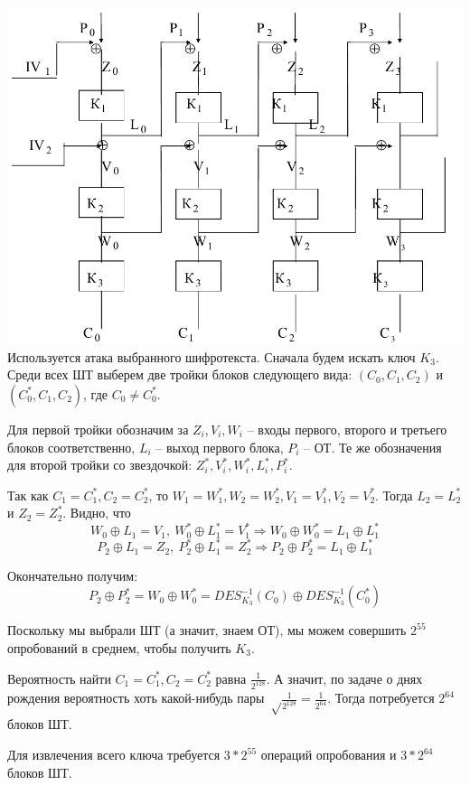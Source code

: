 \includegraphics[scale=.4]{eka/img/CBC_CBC_ECB.png} \\

Используется атака выбранного шифротекста. Сначала будем искать ключ $K_3$. Среди всех ШТ выберем две тройки блоков следующего вида: $(C_0, C_1, C_2)$ и $(C_0^*, C_1, C_2)$, где $C_0 \ne C_0^*$.

Для первой тройки обозначим за $Z_i, V_i, W_i$ -- входы первого, второго и третьего блоков соответственно, $L_i$ -- выход первого блока, $P_i$ -- ОТ. Те же обозначения для второй тройки со звездочкой: $Z_i^*, V_i^*, W_i^*, L_i^*, P_i^*$.

Так как $C_1 = C_1^*, C_2 = C_2^*$, то $W_1 = W_1^*, W_2 = W_2^*, V_1 = V_1^*, V_2 = V_2^*$. Тогда $L_2 = L_2^*$ и $Z_2 = Z_2^*$.
Видно, что
$$W_0 \oplus L_1 = V_1,\ W_0^* \oplus L_1^* = V_1^* \Rightarrow W_0 \oplus W_0^* = L_1 \oplus L_1^*$$
$$P_2 \oplus L_1 = Z_2,\ P_2^* \oplus L_1^* = Z_2^* \Rightarrow P_2 \oplus P_2^* = L_1 \oplus L_1^*$$

Окончательно получим:
$$P_2 \oplus P_2^* = W_0 \oplus W_0^* = DES_{K_3}^{-1}(C_0) \oplus DES_{K_3}^{-1}(C_0^*)$$

Поскольку мы выбрали ШТ (а значит, знаем ОТ), мы можем совершить $2^{55}$ опробований в среднем, чтобы получить $K_3$.

Вероятность найти $C_1 = C_1^*, C_2 = C_2^*$ равна $\frac{1}{2^{128}}$. А значит, по задаче о днях рождения вероятность хоть какой-нибудь пары $\sqrt \frac{1}{2^{128}} = \frac{1}{2^{64}}$. Тогда потребуется $2^{64}$ блоков ШТ.

Для извлечения всего ключа требуется $3 * 2^{55}$ операций опробования и $3 * 2^{64}$ блоков ШТ. \\

